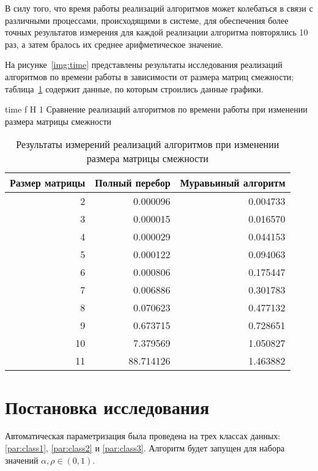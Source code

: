 В силу того, что время работы реализаций алгоритмов может колебаться в связи с различными процессами, происходящими в системе, для обеспечения более точных результатов измерения для каждой реализации алгоритма повторялись 10 раз, а затем бралось их среднее арифметическое значение.

На рисунке~\ref{img:time} представлены результаты исследования реализаций алгоритмов по времени работы в зависимости от размера матриц смежности; таблица~\ref{tbl:time} содержит данные, по которым строились данные графики.

	{time}
	{f}
	{H}
	{1\textwidth}
	{Сравнение реализаций алгоритмов по времени работы при изменении размера матрицы смежности}

\begin{table}[H]
	\centering
	\caption{Результаты измерений реализаций алгоритмов при изменении размера матрицы смежности}
	\label{tbl:time}
	\begin{tabular}{|r|r|r|}
		\hline
		\multicolumn{1}{|l|}{Размер матрицы} &
		\multicolumn{1}{l|}{Полный перебор} &
		\multicolumn{1}{l|}{Муравьиный алгоритм} \\ \hline
		2 &   0.000096 &   0.004733 \\ \hline
		3 &   0.000015 &   0.016570 \\ \hline
		4 &   0.000029 &   0.044153 \\ \hline
		5 &   0.000122 &   0.094063 \\ \hline
		6 &   0.000806 &   0.175447 \\ \hline
		7 &   0.006886 &   0.301783 \\ \hline
		8 &   0.070623 &   0.477132 \\ \hline
		9 &   0.673715 &   0.728651 \\ \hline
		10 &   7.379569 &   1.050827 \\ \hline
		11 &  88.714126 &   1.463882 \\ \hline
	\end{tabular}
\end{table}

\section{Постановка исследования}

Автоматическая параметризация была проведена на трех классах данных: \ref{par:class1}, \ref{par:class2} и \ref{par:class3}.
Алгоритм будет запущен для набора значений $\alpha, \rho \in (0, 1)$.


